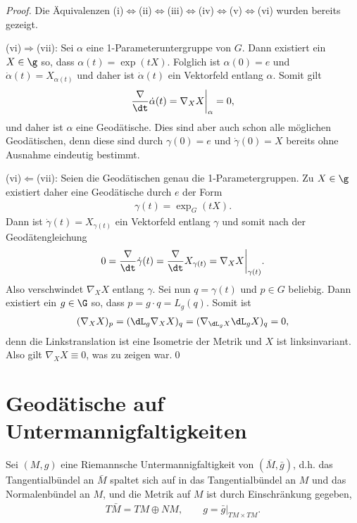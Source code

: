 \documentclass[%
	paper=a5,%
	fleqn,%
	DIV=18,%
	BCOR=0mm,
	fontsize=11pt,
	titlepage=false,%
	bibliography=totoc,
	DIV=18,%
	twoside=true,
	pdftitle=Riemannsche Geometrie,
	pdfauthor=Uwe Semmelmann,
	numbers=noendperiod]%
	{scrbook}
\begin{document}
\begin{proof}
Die Äquivalenzen (i)$\Leftrightarrow$(ii)$\Leftrightarrow$(iii)$\Leftrightarrow$(iv)$\Leftrightarrow$(v)$\Leftrightarrow$(vi) wurden bereits gezeigt.

(vi)$\Rightarrow$(vii): 
Sei $\alpha$ eine 1-Parameteruntergruppe von $G$. Dann existiert ein $X\in \g$ so, dass $\alpha(t) = \exp(tX)$. Folglich ist
$\alpha(0) = e$ und $\dot{\alpha}(t) = X_{\alpha(t)}$ und daher ist $\dot{\alpha}(t)$ ein Vektorfeld entlang $\alpha$. Somit gilt
\begin{align*}
\frac{\nabla}{\dt} \dot{\alpha}(t) = \nabla_{X}X\bigg|_{\alpha} = 0,
\end{align*}
und daher ist $\alpha$ eine Geodätische. Dies sind aber auch schon alle möglichen Geodätischen, denn diese sind durch $\gamma(0) = e$ und $\dot{\gamma}(0) = X$ bereits ohne Ausnahme eindeutig bestimmt.

(vi)$\Leftarrow$(vii): Seien die Geodätischen genau die 1-Parametergruppen. Zu $X\in \g$ existiert daher eine Geodätische durch $e$ der Form
\begin{align*}
\gamma(t) = \exp_{G}(tX).
\end{align*}
Dann ist $\dot{\gamma}(t) = X_{\gamma(t)}$ ein Vektorfeld entlang $\gamma$ und somit nach der Geodätengleichung
\begin{align*}
0 = \frac{\nabla}{\dt} \dot{\gamma}(t) = 
\frac{\nabla}{\dt} X_{\gamma(t)} = 
\nabla_{X}X\bigg|_{\gamma(t)}.
\end{align*}
Also verschwindet $\nabla_{X}X$ entlang $\gamma$. Sei nun $q=\gamma(t)$ und $p\in G$ beliebig. Dann existiert ein $g\in \G$ so, dass $p = g\cdot q = L_{g}(q)$. Somit ist
\begin{align*}
(\nabla_{X}X)_{p} = (\dL_{g}\nabla_{X}X)_{q}
= (\nabla_{\dL_{g}X}\dL_{g}X)_{q} = 0,
\end{align*}
denn die Linkstranslation ist eine Isometrie der Metrik und $X$ ist linksinvariant. Also gilt $\nabla_{X}X\equiv 0$, was zu zeigen war.\qed
\end{proof}

\section{Geodätische auf Untermannigfaltigkeiten}

Sei $(M,g)$ eine Riemannsche Untermannigfaltigkeit von $(\bar{M},\bar{g})$, d.h. das Tangentialbündel an $\bar{M}$ spaltet sich auf in das Tangentialbündel an $M$ und das Normalenbündel an $M$, und die Metrik auf $M$ ist durch Einschränkung gegeben,
\begin{align*}
T\bar{M} = TM\oplus NM,\qquad g = \bar{g}\bigg|_{TM\times TM}.
\end{align*}
\end{document}

